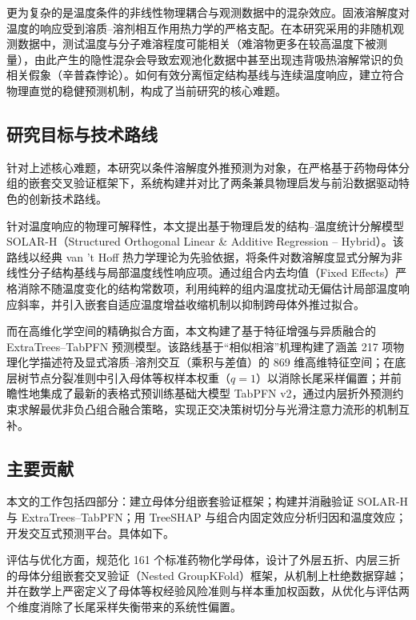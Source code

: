 更为复杂的是温度条件的非线性物理耦合与观测数据中的混杂效应\cite{pearl2009}。固液溶解度对温度的响应受到溶质--溶剂相互作用热力学的严格支配。在本研究采用的非随机观测数据中，测试温度与分子难溶程度可能相关（难溶物更多在较高温度下被测量），由此产生的隐性混杂会导致宏观池化数据中甚至出现违背吸热溶解常识的负相关假象（辛普森悖论）。如何有效分离恒定结构基线与连续温度响应，建立符合物理直觉的稳健预测机制，构成了当前研究的核心难题\cite{vermeire2022,sensitivity2020}。

\subsection{研究目标与技术路线}

针对上述核心难题，本研究以条件溶解度外推预测为对象，在严格基于药物母体分组的嵌套交叉验证框架下\cite{varma2006}，系统构建并对比了两条兼具物理启发与前沿数据驱动特色的创新技术路线。

针对温度响应的物理可解释性，本文提出基于物理启发的结构--温度统计分解模型 SOLAR-H（Structured Orthogonal Linear \& Additive Regression -- Hybrid）。该路线以经典 van 't Hoff 热力学理论为先验依据\cite{vermeire2022}，将条件对数溶解度显式分解为非线性分子结构基线与局部温度线性响应项。通过组合内去均值（Fixed Effects）严格消除不随温度变化的结构常数项，利用纯粹的组内温度扰动无偏估计局部温度响应斜率，并引入嵌套自适应温度增益收缩机制以抑制跨母体外推过拟合。

而在高维化学空间的精确拟合方面，本文构建了基于特征增强与异质融合的 ExtraTrees--TabPFN 预测模型。该路线基于“相似相溶”机理构建了涵盖 217 项物理化学描述符及显式溶质--溶剂交互（乘积与差值）的 869 维高维特征空间\cite{boobier2020}；在底层树节点分裂准则中引入母体等权样本权重（$q=1$）以消除长尾采样偏置\cite{extratrees2006}；并前瞻性地集成了最新的表格式预训练基础大模型 TabPFN v2\cite{tabpfn2025}，通过内层折外预测约束求解最优非负凸组合融合策略，实现正交决策树切分与光滑注意力流形的机制互补。

\subsection{主要贡献}

本文的工作包括四部分：建立母体分组嵌套验证框架；构建并消融验证 SOLAR-H 与 ExtraTrees--TabPFN；用 TreeSHAP 与组合内固定效应分析归因和温度效应；开发交互式预测平台。具体如下。

评估与优化方面，规范化 161 个标准药物化学母体，设计了外层五折、内层三折的母体分组嵌套交叉验证（Nested GroupKFold）框架，从机制上杜绝数据穿越\cite{leakage2023,varma2006}；并在数学上严密定义了母体等权经验风险准则与样本重加权函数，从优化与评估两个维度消除了长尾采样失衡带来的系统性偏置。

